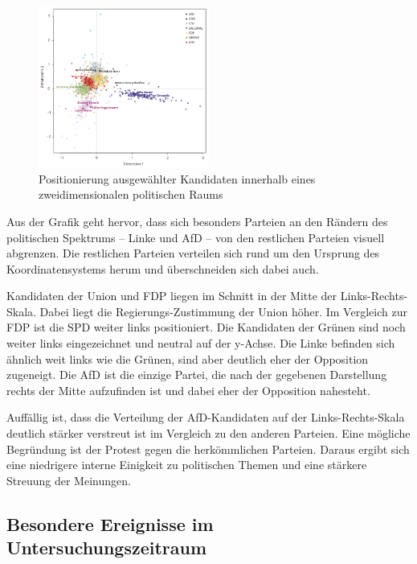\begin{figure}[H]
  \centering
  \includegraphics[width=0.5\textwidth]{data/images/positionierung_ausgewaehlter_kandidaten.png}
  \caption[Positionierung ausgewählter Kandidaten \autocite{saltzer_bundestagswahl_2022}]{Positionierung ausgewählter Kandidaten innerhalb eines zweidimensionalen politischen Raums \autocite{saltzer_bundestagswahl_2022}} \label{fig:positionierungAusgewaehlterKanidaten}
\end{figure}

Aus der Grafik geht hervor, dass sich besonders Parteien an den Rändern des politischen Spektrums -- Linke und \ac{AfD} -- von den restlichen Parteien visuell abgrenzen. Die restlichen Parteien verteilen sich rund um den Ursprung des Koordinatensystems herum und überschneiden sich dabei auch.

Kandidaten der Union und \ac{FDP} liegen im Schnitt in der Mitte der Links-Rechts-Skala. Dabei liegt die Regierungs-Zustimmung der Union höher. Im Vergleich zur \ac{FDP} ist die \ac{SPD} weiter links positioniert. Die Kandidaten der Grünen sind noch weiter links eingezeichnet und neutral auf der y-Achse. Die Linke befinden sich ähnlich weit links wie die Grünen, sind aber deutlich eher der Opposition zugeneigt. Die \ac{AfD} ist die einzige Partei, die nach der gegebenen Darstellung rechts der Mitte aufzufinden ist und dabei eher der Opposition nahesteht.

Auffällig ist, dass die Verteilung der \ac{AfD}-Kandidaten auf der Links-Rechts-Skala deutlich stärker verstreut ist im Vergleich zu den anderen Parteien. Eine mögliche Begründung ist der Protest gegen die herkömmlichen Parteien. Daraus ergibt sich eine niedrigere interne Einigkeit zu politischen Themen und eine stärkere Streuung der Meinungen.

\subsection{Besondere Ereignisse im Untersuchungszeitraum} \label{subsec:besondereEreignisse}

